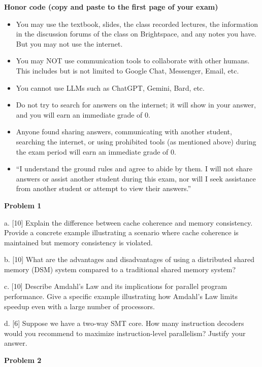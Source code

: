 \documentclass{article}
\begin{document}
\textbf{Honor code (copy and paste to the first page of your exam)}
\begin{itemize}
    \item You may use the textbook, slides, the class recorded lectures, the information in the discussion forums of the class on Brightspace, and any notes you have. But you may not use the internet.
    \item You may NOT use communication tools to collaborate with other humans. This includes but is not limited to Google Chat, Messenger, Email, etc.
    \item You cannot use LLMs such as ChatGPT, Gemini, Bard, etc.
    \item Do not try to search for answers on the internet; it will show in your answer, and you will earn an immediate grade of 0.
    \item Anyone found sharing answers, communicating with another student, searching the internet, or using prohibited tools (as mentioned above) during the exam period will earn an immediate grade of 0.
    \item ``I understand the ground rules and agree to abide by them. I will not share answers or assist another student during this exam, nor will I seek assistance from another student or attempt to view their answers.''
\end{itemize}

\vspace{1cm}

\textbf{Problem 1}

a. [10]  Explain the difference between cache coherence and memory consistency.  Provide a concrete example illustrating a scenario where cache coherence is maintained but memory consistency is violated.

b. [10] What are the advantages and disadvantages of using a distributed shared memory (DSM) system compared to a traditional shared memory system?

c. [10] Describe Amdahl's Law and its implications for parallel program performance.  Give a specific example illustrating how Amdahl's Law limits speedup even with a large number of processors.

d. [6]  Suppose we have a two-way SMT core. How many instruction decoders would you recommend to maximize instruction-level parallelism? Justify your answer.


\vspace{1cm}

\textbf{Problem 2}
\end{document}

